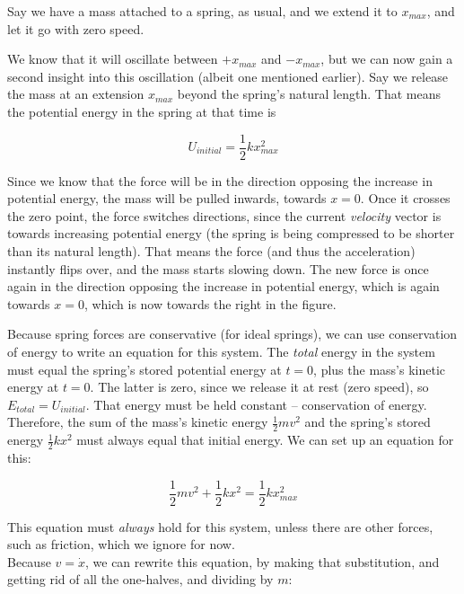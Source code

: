 Say we have a mass attached to a spring, as usual, and we extend it to $x_{max}$, and let it go with zero speed.

We know that it will oscillate between $+x_{max}$ and $-x_{max}$, but we can now gain a second insight into this oscillation (albeit one mentioned earlier). Say we release the mass at an extension $x_{max}$ beyond the spring's natural length. That means the potential energy in the spring at that time is

\begin{equation}
U_{initial} = \frac{1}{2} k x_{max}^2
\end{equation}


Since we know that the force will be in the direction opposing the increase in potential energy, the mass will be pulled inwards, towards $x = 0$. Once it crosses the zero point, the force switches directions, since the current \emph{velocity} vector is towards increasing potential energy (the spring is being compressed to be shorter than its natural length). That means the force (and thus the acceleration) instantly flips over, and the mass starts slowing down. The new force is once again in the direction opposing the increase in potential energy, which is again towards $x = 0$, which is now towards the right in the figure.

Because spring forces are conservative (for ideal springs), we can use conservation of energy to write an equation for this system. The \emph{total} energy in the system must equal the spring's stored potential energy at $t = 0$, plus the mass's kinetic energy at $t = 0$. The latter is zero, since we release it at rest (zero speed), so $E_{total} = U_{initial}$. That energy must be held constant -- conservation of energy. Therefore, the sum of the mass's kinetic energy $\displaystyle \frac{1}{2} m v^2$ and the spring's stored energy $\displaystyle \frac{1}{2} k x^2$ must always equal that initial energy. We can set up an equation for this:

\begin{equation}
\frac{1}{2} m v^2 + \frac{1}{2} k x^2 = \frac{1}{2} k x_{max}^2
\end{equation}

This equation must \emph{always} hold for this system, unless there are other forces, such as friction, which we ignore for now.\\
Because $v = \dot{x}$, we can rewrite this equation, by making that substitution, and getting rid of all the one-halves, and dividing by $m$:

